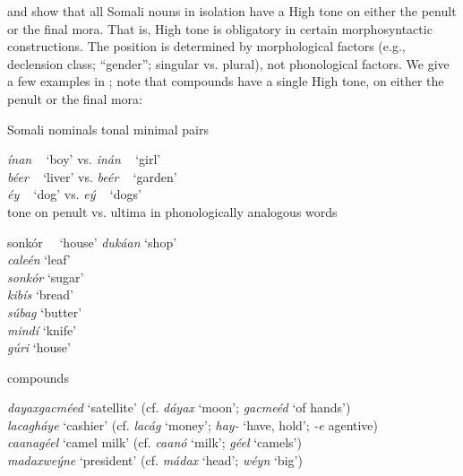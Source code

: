 \documentclass[output=paper]{langscibook}
\begin{document}
\citet{Hyman1981,Saeed1993,Saeed1999} and \citet{Green2016} show that all Somali nouns in isolation have a High tone on either the penult or the final mora. That is, High tone is obligatory in certain morphosyntactic constructions. The position is determined by morphological factors (e.g., declension class; ``gender''; singular vs. plural), not phonological factors. We give a few examples in ; note that compounds have a single High tone, on either the penult or the final mora:
 
\ea  Somali nominals \label{ex:downing:1}
  \ea tonal minimal pairs \label{ex:downing:1a}
  
  \glll
  \textit{ínan} ~ \textup{‘boy’} \hspace{1cm} vs.  \hspace{1cm}   \textit{inán}   ~ \textup{‘girl’}\\
  \textit{béer}  ~ \textup{‘liver’} \hspace{1cm}  vs. \hspace{1cm} \textit{beér} ~ \textup{‘garden’}\\
  \textit{éy} ~ \textup{‘dog’} \hspace{1cm}  vs. \hspace{1cm}   \textit{eý} ~ \textup{‘dogs’}\\
  
  \ex tone on penult vs. ultima in phonologically analogous words\label{ex:downing:1b}
  
  \begin{tabbing}
  sonkór~~ \= \textup{‘house’}\kill
  \textit{dukáan} \> \textup{‘shop’}\\
  \textit{caleén} \> \textup{‘leaf’}\\
  \textit{sonkór} \> \textup{‘sugar’}\\
  \textit{kibís} \> \textup{‘bread’}\\
  \textit{súbag} \> \textup{‘butter’}\\
  \textit{mindí} \> \textup{‘knife’}\\
  \textit{gúri} \> \textup{‘house’}
  \end{tabbing}

  \ex compounds \label{ex:downing:1c}

  \textit{dayaxgacméed} \textup{‘satellite’ (cf.} \textit{dáyax} \textup{‘moon’;}  \textit{gacmeéd} \textup{‘of hands’)}\\
  \textit{lacagháye} \textup{‘cashier’    (cf.}   \textit{lacág} \textup{‘money’;} \textit{hay-} \textup{‘have, hold’;} \textit{-e} \textup{agentive)}\\
  \textit{caanagéel} \textup{‘camel milk’ (cf.}   \textit{caanó} \textup{‘milk’;}  \textit{géel} \textup{‘camels’)}\\
  \textit{madaxweýne} \textup{‘president’ (cf.}   \textit{mádax} \textup{‘head’;}  \textit{wéyn} \textup{‘big’)}\\
  \z
\z
\end{document}
